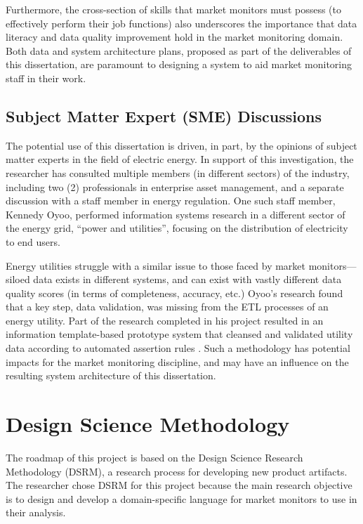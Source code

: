 Furthermore, the cross-section of skills that market monitors must possess (to effectively perform their job functions) also underscores the importance that data literacy and data quality improvement hold in the market monitoring domain. Both data and system architecture plans, proposed as part of the deliverables of this dissertation, are paramount to designing a system to aid market monitoring staff in their work.

\subsection{Subject Matter Expert (SME) Discussions}

The potential use of this dissertation is driven, in part, by the opinions of subject matter experts in the field of electric energy. In support of this investigation, the researcher has consulted multiple members (in different sectors) of the industry, including two (2) professionals in enterprise asset management, and a separate discussion with a staff member in energy regulation. One such staff member, Kennedy Oyoo, performed information systems research in a different sector of the energy grid, “power and utilities”, focusing on the distribution of electricity to end users.

Energy utilities struggle with a similar issue to those faced by market monitors--- siloed data exists in different systems, and can exist with vastly different data quality scores (in terms of completeness, accuracy, etc.) Oyoo’s research found that a key step, data validation, was missing from the ETL processes of an energy utility. Part of the research completed in his project resulted in an information template-based prototype system that cleansed and validated utility data according to automated assertion rules \cite{oyoo}. Such a methodology has potential impacts for the market monitoring discipline, and may have an influence on the resulting system architecture of this dissertation.

\section{Design Science Methodology}

The roadmap of this project is based on the Design Science Research Methodology (DSRM), a research process for developing new product artifacts. The researcher chose DSRM for this project because the main research objective is to design and develop a domain-specific language for market monitors to use in their analysis.

